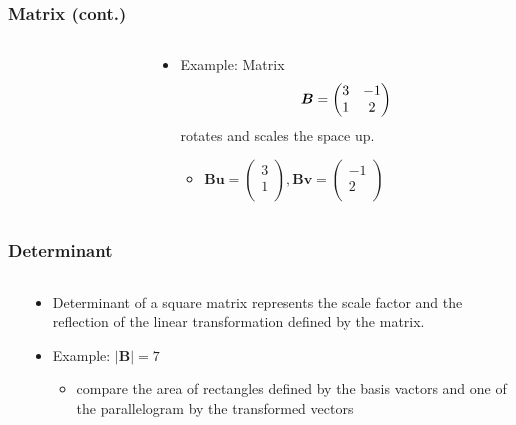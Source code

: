 \documentclass[pdflatex, 12pt]{beamer}
\begin{document}
\begin{frame}
\frametitle{Matrix (cont.)}
\begin{columns}
\begin{column}{0.5\textwidth}
\centering
{}
\end{column}
\begin{column}{0.5\textwidth}
\begin{itemize}
\item Example: Matrix 
 \begin{equation}
 \bm{B} = \begin{pmatrix}
 3 & -1 \\
 1 & 2 \\
 \end{pmatrix} \notag
 \end{equation}
rotates and scales the space up.
 \begin{itemize}
 \item $\bm{Bu} = \begin{pmatrix}
 3 \\
 1 \\
 \end{pmatrix}, \bm{Bv} = \begin{pmatrix}
 -1 \\
 2 \\
 \end{pmatrix}$
 \end{itemize}
\end{itemize}
\end{column}
\end{columns}
\end{frame}

\begin{frame}
\frametitle{Determinant}
\begin{columns}
\begin{column}{0.5\textwidth}
\centering
{}
\end{column}
\begin{column}{0.5\textwidth}
\begin{itemize}
\item Determinant of a square matrix represents the scale factor and the reflection of the linear transformation defined by the matrix.
\vspace{0.4cm}
\item Example: $|\bm{B}| = 7$
 \begin{itemize}
 \item compare the area of rectangles defined by the basis vactors and one of the parallelogram by the transformed vectors
 \end{itemize}
\end{itemize}
\end{column}
\end{columns}
\end{frame}
\end{document}
